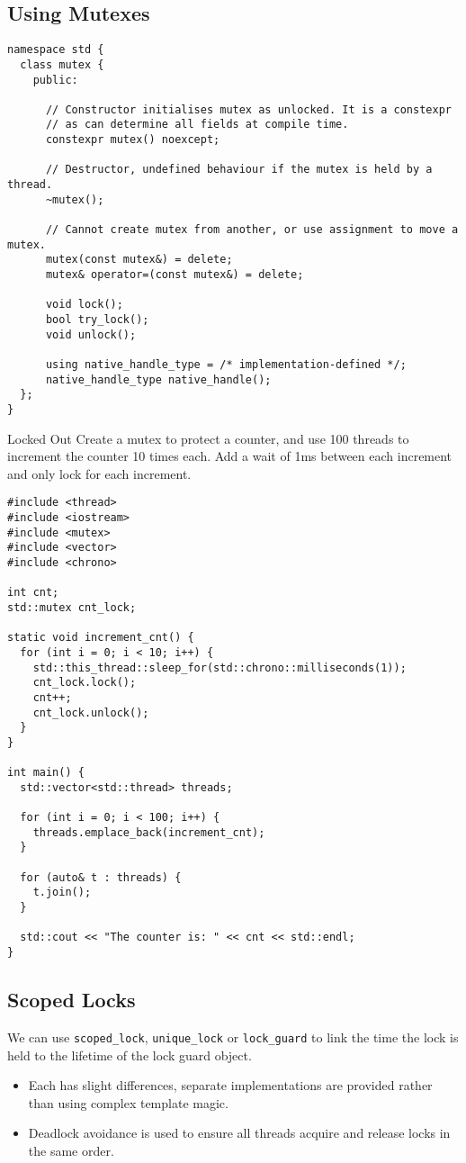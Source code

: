 \subsection{Using Mutexes}
\begin{verbatim}
namespace std {
  class mutex {
    public:

      // Constructor initialises mutex as unlocked. It is a constexpr 
      // as can determine all fields at compile time.
      constexpr mutex() noexcept;
      
      // Destructor, undefined behaviour if the mutex is held by a thread.
      ~mutex();

      // Cannot create mutex from another, or use assignment to move a mutex.
      mutex(const mutex&) = delete;
      mutex& operator=(const mutex&) = delete;
    
      void lock();
      bool try_lock();
      void unlock();
    
      using native_handle_type = /* implementation-defined */;
      native_handle_type native_handle();
  };
}
\end{verbatim}

\begin{examplebox}{Locked Out}
  Create a mutex to protect a counter, and use 100 threads to increment the counter 10 times each. Add a wait of 1ms between each increment and only lock for each increment.
  \tcblower
  \begin{verbatim}
#include <thread>
#include <iostream>
#include <mutex>
#include <vector>
#include <chrono>

int cnt;
std::mutex cnt_lock;

static void increment_cnt() {
  for (int i = 0; i < 10; i++) {
    std::this_thread::sleep_for(std::chrono::milliseconds(1));    
    cnt_lock.lock();
    cnt++;
    cnt_lock.unlock();
  }
}

int main() {
  std::vector<std::thread> threads;

  for (int i = 0; i < 100; i++) {
    threads.emplace_back(increment_cnt);
  }

  for (auto& t : threads) {
    t.join();
  }

  std::cout << "The counter is: " << cnt << std::endl;
}
  \end{verbatim} 
\end{examplebox}

\subsection{Scoped Locks}
We can use \texttt{scoped_lock}, \texttt{unique_lock} or \texttt{lock_guard} to link the time the lock is held to the lifetime of the lock guard object.
\begin{itemize}
  \item Each has slight differences, separate implementations are provided rather than using complex template magic.
  \item Deadlock avoidance is used to ensure all threads acquire and release locks in the same order.
\end{itemize}

